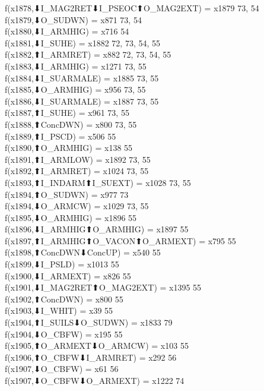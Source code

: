 f(x1878,⬇I_MAG2RET⬇I_PSEOC⬆O_MAG2EXT) = x1879 {73, 54} \\
f(x1879,⬇O_SUDWN) = x871 {73, 54} \\
f(x1880,⬇I_ARMHIG) = x716 {54} \\
f(x1881,⬇I_SUHE) = x1882 {72, 73, 54, 55} \\
f(x1882,⬆I_ARMRET) = x882 {72, 73, 54, 55} \\
f(x1883,⬇I_ARMHIG) = x1271 {73, 55} \\
f(x1884,⬇I_SUARMALE) = x1885 {73, 55} \\
f(x1885,⬇O_ARMHIG) = x956 {73, 55} \\
f(x1886,⬇I_SUARMALE) = x1887 {73, 55} \\
f(x1887,⬆I_SUHE) = x961 {73, 55} \\
f(x1888,⬆ConcDWN) = x800 {73, 55} \\
f(x1889,⬆I_PSCD) = x506 {55} \\
f(x1890,⬆O_ARMHIG) = x138 {55} \\
f(x1891,⬆I_ARMLOW) = x1892 {73, 55} \\
f(x1892,⬆I_ARMRET) = x1024 {73, 55} \\
f(x1893,⬆I_INDARM⬆I_SUEXT) = x1028 {73, 55} \\
f(x1894,⬆O_SUDWN) = x977 {73} \\
f(x1894,⬇O_ARMCW) = x1029 {73, 55} \\
f(x1895,⬇O_ARMHIG) = x1896 {55} \\
f(x1896,⬇I_ARMHIG⬆O_ARMHIG) = x1897 {55} \\
f(x1897,⬆I_ARMHIG⬆O_VACON⬆O_ARMEXT) = x795 {55} \\
f(x1898,⬆ConcDWN⬇ConcUP) = x540 {55} \\
f(x1899,⬇I_PSLD) = x1013 {55} \\
f(x1900,⬇I_ARMEXT) = x826 {55} \\
f(x1901,⬇I_MAG2RET⬆O_MAG2EXT) = x1395 {55} \\
f(x1902,⬆ConcDWN) = x800 {55} \\
f(x1903,⬇I_WHIT) = x39 {55} \\
f(x1904,⬆I_SUILS⬇O_SUDWN) = x1833 {79} \\
f(x1904,⬇O_CBFW) = x195 {55} \\
f(x1905,⬆O_ARMEXT⬇O_ARMCW) = x103 {55} \\
f(x1906,⬆O_CBFW⬇I_ARMRET) = x292 {56} \\
f(x1907,⬇O_CBFW) = x61 {56} \\
f(x1907,⬇O_CBFW⬇O_ARMEXT) = x1222 {74} \\
